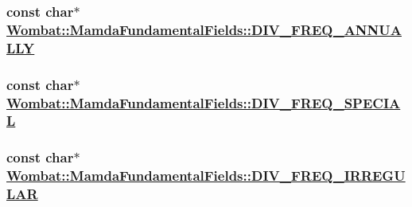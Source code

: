 \hypertarget{classWombat_1_1MamdaFundamentalFields_a337ec65b066437b982921a94b17c88d}{
\subsubsection[DIV\_\-FREQ\_\-ANNUALLY]{\setlength{\rightskip}{0pt plus 5cm}const char$\ast$ \hyperlink{classWombat_1_1MamdaFundamentalFields_a337ec65b066437b982921a94b17c88d}{Wombat::Mamda\-Fundamental\-Fields::DIV\_\-FREQ\_\-ANNUALLY}}}
\label{classWombat_1_1MamdaFundamentalFields_a337ec65b066437b982921a94b17c88d}


\hypertarget{classWombat_1_1MamdaFundamentalFields_a5d0bdb1c17eae49455c07cc29eb1cd4}{
\subsubsection[DIV\_\-FREQ\_\-SPECIAL]{\setlength{\rightskip}{0pt plus 5cm}const char$\ast$ \hyperlink{classWombat_1_1MamdaFundamentalFields_a5d0bdb1c17eae49455c07cc29eb1cd4}{Wombat::Mamda\-Fundamental\-Fields::DIV\_\-FREQ\_\-SPECIAL}}}
\label{classWombat_1_1MamdaFundamentalFields_a5d0bdb1c17eae49455c07cc29eb1cd4}


\hypertarget{classWombat_1_1MamdaFundamentalFields_e1286d0fb3aa76a1cf96f0903ad5fb23}{
\subsubsection[DIV\_\-FREQ\_\-IRREGULAR]{\setlength{\rightskip}{0pt plus 5cm}const char$\ast$ \hyperlink{classWombat_1_1MamdaFundamentalFields_e1286d0fb3aa76a1cf96f0903ad5fb23}{Wombat::Mamda\-Fundamental\-Fields::DIV\_\-FREQ\_\-IRREGULAR}}}
\label{classWombat_1_1MamdaFundamentalFields_e1286d0fb3aa76a1cf96f0903ad5fb23}


